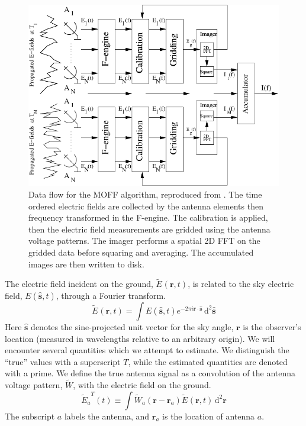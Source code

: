\documentclass[a4paper,fleqn,usenatbib]{mnras}
\newcommand{\ra}{\ensuremath{\mathbf{r}_a}}
\newcommand{\beamr}{\ensuremath{\widetilde{W}}}
\newcommand{\Er}[1]{\ensuremath{\widetilde{E}_{#1}}}
\newcommand{\dif}{\mathrm{d}}
\begin{document}
\begin{figure}
\begin{center}
\includegraphics[width=\columnwidth]{MOFF_flowchart.pdf}
\caption{Data flow for the MOFF algorithm, reproduced from \citealt{thy15c}. The time ordered electric fields are collected by the antenna elements then frequency transformed in the F-engine. The calibration is applied, then the electric field measurements are gridded using the antenna voltage patterns. The imager performs a spatial 2D FFT on the gridded data before squaring and averaging. The accumulated images are then written to disk.}
\label{fig:moff_flow}
\end{center}
\end{figure}

The electric field incident on the ground, $\Er{}(\mathbf{r},t)$, is related to the sky electric field, $E(\hat{\mathbf{s}},t)$, through a Fourier transform.
\begin{equation}
\Er{}(\mathbf{r},t) = \int E(\hat{\mathbf{s}},t) e^{-2\pi i \mathbf{r}\cdot \hat{\mathbf{s}}}\, \dif^2 \hat{\mathbf{s}}
\end{equation}
Here $\hat{\mathbf{s}}$ denotes the sine-projected unit vector for the sky angle, $\mathbf{r}$ is the observer's location (measured in wavelengths relative to an arbitrary origin). We will encounter several quantities which we attempt to estimate. We distinguish the ``true'' values with a superscript $T$, while the estimated quantities are denoted with a prime. We define the true antenna signal as a convolution of the antenna voltage pattern, \beamr, with the electric field on the ground.
\begin{equation}
\Er{a}^T(t) \equiv \int \beamr_a(\mathbf{r}-\ra) \Er{}(\mathbf{r},t) \, \dif^2 \mathbf{r}
\end{equation}
The subscript $a$ labels the antenna, and $\mathbf{r}_a$ is the location of antenna $a$. 
\end{document}
